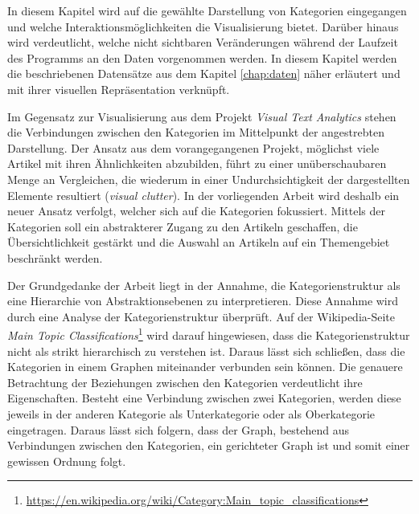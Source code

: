 
In diesem Kapitel wird auf die gewählte Darstellung von Kategorien eingegangen und welche Interaktionsmöglichkeiten die Visualisierung bietet.
Darüber hinaus wird verdeutlicht, welche nicht sichtbaren Veränderungen während der Laufzeit des Programms an den Daten vorgenommen werden.
In diesem Kapitel werden die beschriebenen Datensätze aus dem Kapitel \ref{chap:daten} näher erläutert und mit ihrer visuellen Repräsentation verknüpft.

Im Gegensatz zur Visualisierung aus dem Projekt \emph{Visual Text Analytics} stehen die Verbindungen zwischen den Kategorien im Mittelpunkt der angestrebten Darstellung.
Der Ansatz aus dem vorangegangenen Projekt, möglichst viele Artikel mit ihren Ähnlichkeiten abzubilden, führt zu einer unüberschaubaren Menge an Vergleichen, die wiederum in einer Undurchsichtigkeit der dargestellten Elemente resultiert (\emph{visual clutter}).
In der vorliegenden Arbeit wird deshalb ein neuer Ansatz verfolgt, welcher sich auf die Kategorien fokussiert.
Mittels der Kategorien soll ein abstrakterer Zugang zu den Artikeln geschaffen, die Übersichtlichkeit gestärkt und die Auswahl an Artikeln auf ein Themengebiet beschränkt werden.

Der Grundgedanke der Arbeit liegt in der Annahme, die Kategorienstruktur als eine Hierarchie von Abstraktionsebenen zu interpretieren.
Diese Annahme wird durch eine Analyse der Kategorienstruktur überprüft.
Auf der Wikipedia-Seite \emph{Main Topic Classifications}\footnote{\url{https://en.wikipedia.org/wiki/Category:Main_topic_classifications}} wird darauf hingewiesen, dass die Kategorienstruktur nicht als strikt hierarchisch zu verstehen ist.
Daraus lässt sich schließen, dass die Kategorien in einem Graphen miteinander verbunden sein können.
Die genauere Betrachtung der Beziehungen zwischen den Kategorien verdeutlicht ihre Eigenschaften.
Besteht eine Verbindung zwischen zwei Kategorien, werden diese jeweils in der anderen Kategorie als Unterkategorie oder als Oberkategorie eingetragen. 
Daraus lässt sich folgern, dass der Graph, bestehend aus Verbindungen zwischen den Kategorien, ein gerichteter Graph ist und somit einer gewissen Ordnung folgt.

